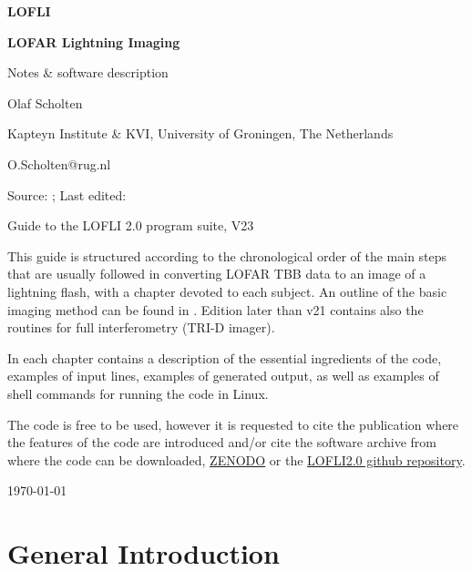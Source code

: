 \documentclass[fleqn,11pt, A4paper]{book}
\newcommand*{\FileDate}[1]{\expandafter\filedateX\pdffilemoddate{#1}\relax}
\def\filedateX#1#2#3#4#5#6#7#8{%
\filedateXX{#3#4#5#6}{#7#8}}
\def\filedateXX#1#2#3#4#5#6#7#8{%
\filedateXXX{#1}{#2}{#3#4}{#5#6}{#7#8}}
\def\filedateXXX#1#2#3#4#5#6#7#8\relax{\formatdate{#1}{#2}{#3}{#4}{#5}{#6#7}}
\newcommand*{\formatdate}[6]{#1-#2-#3\ #4:#5:#6}
\begin{document}
\centerline{\LARGE \bf LOFLI}\vspace{2ex}
\centerline{\Large \bf LOFAR Lightning Imaging}\vspace{2ex}
\centerline{\Large Notes \& software description}\vspace{2ex}
\centerline{Olaf Scholten}\vspace{2ex}
\centerline{Kapteyn Institute \& KVI, University of Groningen, The Netherlands}\vspace{2ex}
\centerline{O.Scholten@rug.nl}\vspace{2ex}
\centerline{Source: \texttt{\jobname}; \hspace{3ex}
Last edited: \FileDate{\jobname.tex} }\vspace{15ex}
\centerline{\Large  Guide to the LOFLI 2.0 program suite, V23}


\newpage

\vspace{2ex}
This guide is structured according to the chronological order of the main steps that are usually followed in converting LOFAR TBB data to an image of a lightning flash, with a chapter devoted to each subject. An outline of the basic imaging method can be found in \cite{Scholten:2021-init}.
Edition later than v21 contains also the routines for full interferometry (TRI-D imager).

In each chapter contains a description of the essential ingredients of the code, examples of input lines, examples of generated output, as well as examples of shell commands for running the code in Linux.

The code is free to be used, however it is requested to cite the publication where the features of the code are introduced and/or cite the software archive from where the code can be downloaded, \href{https://zenodo.org/records/7393903}{ZENODO} or the \href{https://github.com/OlafScholten/LOFLI/tree/LOFLI2.0}{LOFLI2.0 github repository}.

\newpage

\tableofcontents


\hfill \today

\chapter{General Introduction}
\end{document}
